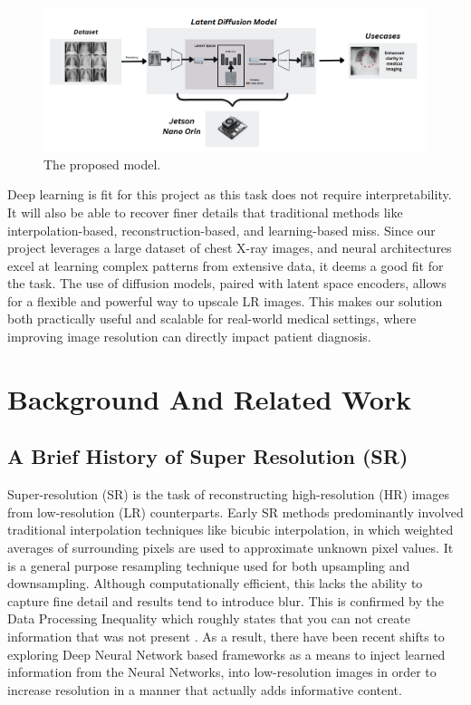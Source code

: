 \documentclass{article} %
\begin{document}
\begin{figure}[h]
\begin{center}
\includegraphics[width=1\textwidth]{Figs/modelmain.png}
\end{center}
\caption{The proposed model.}
\end{figure}

Deep learning is fit for this project as this task does not require interpretability. It will also be able to recover finer details that traditional methods like interpolation-based, reconstruction-based, and learning-based miss. Since our project leverages a large dataset of chest X-ray images, and neural architectures excel at learning complex patterns from extensive data, it deems a good fit for the task. The use of diffusion models, paired with latent space encoders, allows for a flexible and powerful way to upscale LR images. This makes our solution both practically useful and scalable for real-world medical settings, where improving image resolution can directly impact patient diagnosis.

\section{Background And Related Work}

\subsection{A Brief History of Super Resolution (SR)}

Super-resolution (SR) is the task of reconstructing high-resolution (HR) images from low-resolution (LR) counterparts. Early SR methods predominantly involved traditional interpolation techniques like bicubic interpolation, in which weighted averages of surrounding pixels are used to approximate unknown pixel values. It is a general purpose resampling technique used for both upsampling and downsampling. Although computationally efficient, this lacks the ability to capture fine detail and results tend to introduce blur. This is confirmed by the Data Processing Inequality which roughly states that you can not create information that was not present \citep{cover2012elements}. As a result, there have been recent shifts to exploring Deep Neural Network based frameworks as a means to inject learned information from the Neural Networks, into low-resolution images in order to increase resolution in a manner that actually adds informative content. 
\end{document}
